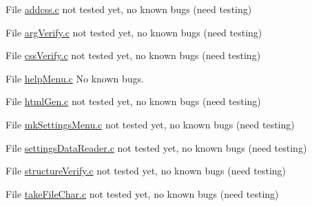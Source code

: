 
\begin{DoxyRefList}
\item[File \mbox{\hyperlink{addcss_8c}{addcss.c}} ]\label{bug__bug000001}%
%
not tested yet, no known bugs (need testing)  
\item[File \mbox{\hyperlink{argVerify_8c}{arg\+Verify.c}} ]\label{bug__bug000002}%
%
not tested yet, no known bugs (need testing)  
\item[File \mbox{\hyperlink{cssVerify_8c}{css\+Verify.c}} ]\label{bug__bug000003}%
%
not tested yet, no known bugs (need testing)  
\item[File \mbox{\hyperlink{helpMenu_8c}{help\+Menu.c}} ]\label{bug__bug000004}%
%
No known bugs.  
\item[File \mbox{\hyperlink{htmlGen_8c}{html\+Gen.c}} ]\label{bug__bug000005}%
%
not tested yet, no known bugs (need testing) 
\item[File \mbox{\hyperlink{mkSettingsMenu_8c}{mk\+Settings\+Menu.c}} ]\label{bug__bug000006}%
%
not tested yet, no known bugs (need testing)  
\item[File \mbox{\hyperlink{settingsDataReader_8c}{settings\+Data\+Reader.c}} ]\label{bug__bug000007}%
%
not tested yet, no known bugs (need testing)  
\item[File \mbox{\hyperlink{structureVerify_8c}{structure\+Verify.c}} ]\label{bug__bug000008}%
%
not tested yet, no known bugs (need testing)  
\item[File \mbox{\hyperlink{takeFileChar_8c}{take\+File\+Char.c}} ]\label{bug__bug000009}%
%
not tested yet, no known bugs (need testing) 
\end{DoxyRefList}